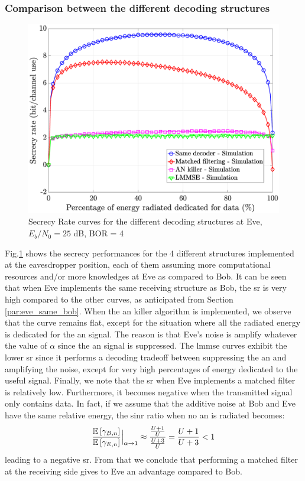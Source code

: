 \subsubsection{Comparison between the different decoding structures}
\begin{figure}[htb!]
    \centering
    \centerline{\includegraphics[width = .65\textwidth]{graphs/SR_filter_comparaison_new.eps}}
    \caption{Secrecy Rate curves for the different decoding structures at Eve, $E_b/N_0=25$ dB, BOR = 4 }
    \label{fig:secrecy_filt_comparaison}
\end{figure}
Fig.\ref{fig:secrecy_filt_comparaison} shows the secrecy performances for the 4 different structures implemented at the eavesdropper position, each of them assuming more computational resources and/or more knowledges at Eve as compared to Bob. It can be seen that when Eve implements the same receiving structure as Bob, the \gls{sr} is very high compared to the other curves, as anticipated from Section \ref{par:eve_same_bob}. When the \gls{an} killer algorithm is implemented, we observe that the curve remains flat, except for the situation where all the radiated energy is dedicated for the \gls{an} signal. The reason is that Eve's noise is amplify whatever the value of $\alpha$ since the \gls{an} signal is suppressed. The \gls{lmmse} curves exhibit the lower \gls{sr} since it performs a decoding tradeoff between suppressing the \gls{an} and amplifying the noise, except for very high percentages of energy dedicated to the useful signal. Finally, we note that the \gls{sr} when Eve implements a matched filter is relatively low. Furthermore, it becomes negative when the transmitted signal only contains data. In fact, if we assume that the additive noise at Bob and Eve have the same relative energy, the \gls{sinr} ratio when no \gls{an} is radiated becomes:
\begin{equation}
    \frac{\mathbb{E} \left[\gamma_{B,n}\right]}{\mathbb{E} \left[\gamma_{E,n}\right]}\Big|_{\alpha \to 1} \approx \frac{\frac{U+1}{U}}{\frac{U+3}{U}}= \frac{U+1}{U+3}< 1
\end{equation}
leading to a negative \gls{sr}. From that we conclude that performing a matched filter at the receiving side gives to Eve an advantage compared to Bob.






